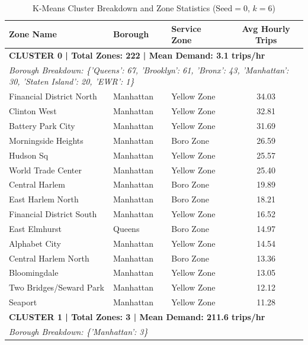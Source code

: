 \documentclass[11pt,a4paper]{article}
\begin{document}
\begin{table}[htbp]
    \centering
    \tiny
    \caption{K-Means Cluster Breakdown and Zone Statistics ($\text{Seed} = 0$, $k = 6$)}
    \label{tab:kmeans_seed0_clusters}
    \begin{tabular}{lllc}
        \toprule
        \textbf{Zone Name} & \textbf{Borough} & \textbf{Service Zone} & \textbf{Avg Hourly Trips} \\
        \midrule
        \multicolumn{4}{l}{\textbf{CLUSTER 0 | Total Zones: 222 | Mean Demand: 3.1 trips/hr}} \\
        \multicolumn{4}{l}{\textit{Borough Breakdown: \{'Queens': 67, 'Brooklyn': 61, 'Bronx': 43, 'Manhattan': 30, 'Staten Island': 20, 'EWR': 1\}}} \\
        \midrule
        Financial District North & Manhattan & Yellow Zone & 34.03 \\
        Clinton West & Manhattan & Yellow Zone & 32.81 \\
        Battery Park City & Manhattan & Yellow Zone & 31.69 \\
        Morningside Heights & Manhattan & Boro Zone & 26.59 \\
        Hudson Sq & Manhattan & Yellow Zone & 25.57 \\
        World Trade Center & Manhattan & Yellow Zone & 25.40 \\
        Central Harlem & Manhattan & Boro Zone & 19.89 \\
        East Harlem North & Manhattan & Boro Zone & 18.21 \\
        Financial District South & Manhattan & Yellow Zone & 16.52 \\
        East Elmhurst & Queens & Boro Zone & 14.97 \\
        Alphabet City & Manhattan & Yellow Zone & 14.54 \\
        Central Harlem North & Manhattan & Boro Zone & 13.36 \\
        Bloomingdale & Manhattan & Yellow Zone & 13.05 \\
        Two Bridges/Seward Park & Manhattan & Yellow Zone & 12.12 \\
        Seaport & Manhattan & Yellow Zone & 11.28 \\
        \midrule
        \multicolumn{4}{l}{\textbf{CLUSTER 1 | Total Zones: 3 | Mean Demand: 211.6 trips/hr}} \\
        \multicolumn{4}{l}{\textit{Borough Breakdown: \{'Manhattan': 3\}}} \\
        \midrule

\end{tabular}
\end{table}
\end{document}
